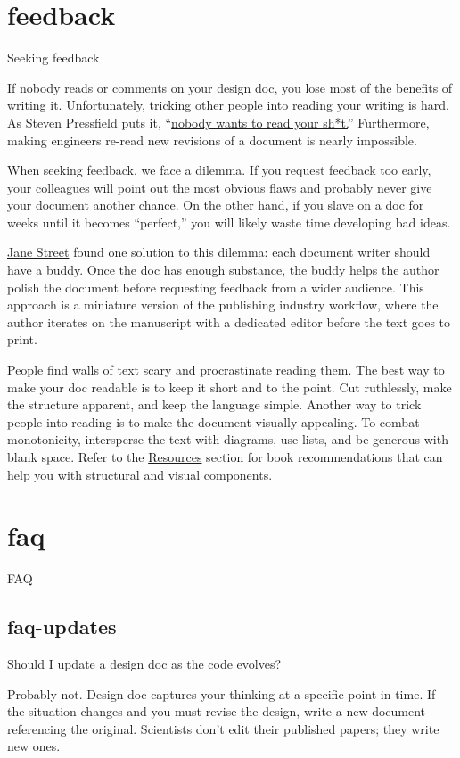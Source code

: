 \documentclass{article}
\begin{document}
\section{feedback}{Seeking feedback}

If nobody reads or comments on your design doc, you lose most of the benefits of writing it.
Unfortunately, tricking other people into reading your writing is hard.
As Steven Pressfield puts it, ``\href{https://www.amazon.com/gp/product/B01GZ1TJBI}{nobody wants to read your sh*t.}''
Furthermore, making engineers re-read new revisions of a document is nearly impossible.

When seeking feedback, we face a dilemma.
If you request feedback too early, your colleagues will point out the most obvious flaws and probably never give your document another chance.
On the other hand, if you slave on a doc for weeks until it becomes ``perfect,'' you will likely waste time developing bad ideas.

\href{https://www.janestreet.com/}{Jane Street} found one solution to this dilemma: each document writer should have a buddy.
Once the doc has enough substance, the buddy helps the author polish the document before requesting feedback from a wider audience.
This approach is a miniature version of the publishing industry workflow, where the author iterates on the manuscript with a dedicated editor before the text goes to print.

People find walls of text scary and procrastinate reading them.
The best way to make your doc readable is to keep it short and to the point.
Cut ruthlessly, make the structure apparent, and keep the language simple.
Another way to trick people into reading is to make the document visually appealing.
To combat monotonicity, intersperse the text with diagrams, use lists, and be generous with blank space.
Refer to the \href{#resources}{Resources} section for book recommendations that can help you with structural and visual components.

\section{faq}{FAQ}

\subsection{faq-updates}{Should I update a design doc as the code evolves?}

Probably not.
Design doc captures your thinking at a specific point in time.
If the situation changes and you must revise the design, write a new document referencing the original.
Scientists don't edit their published papers; they write new ones.
\end{document}
